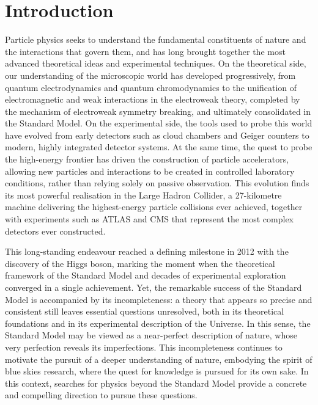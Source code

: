 ﻿%

\chapter{Introduction}






Particle physics seeks to understand the fundamental constituents of nature and the interactions that govern them, and has long brought together the most advanced theoretical ideas and experimental techniques. 
On the theoretical side, our understanding of the microscopic world has developed progressively, 
from quantum electrodynamics and quantum chromodynamics 
to the unification of electromagnetic and weak interactions in the electroweak theory, 
completed by the mechanism of electroweak symmetry breaking, 
and ultimately consolidated in the Standard Model.
On the experimental side, the tools used to probe this world have evolved from early detectors such as cloud chambers and Geiger counters to modern, highly integrated detector systems. 
At the same time, the quest to probe the high-energy frontier has driven the construction of particle accelerators, allowing new particles and interactions to be created in controlled laboratory conditions, rather than relying solely on passive observation.
This evolution finds its most powerful realisation in the Large Hadron Collider, a 27-kilometre machine delivering the highest-energy particle collisions ever achieved, together with experiments such as ATLAS and CMS that represent the most complex detectors ever constructed.

This long-standing endeavour reached a defining milestone in 2012 with the discovery of the Higgs boson, marking the moment when the theoretical framework of the Standard Model and decades of experimental exploration converged in a single achievement.
Yet, the remarkable success of the Standard Model is accompanied by its incompleteness: 
a theory that appears so precise and consistent still leaves essential questions unresolved, 
both in its theoretical foundations and in its experimental description of the Universe. 
In this sense, the Standard Model may be viewed as a near-perfect description of nature, 
whose very perfection reveals its imperfections.
This incompleteness continues to motivate the pursuit of a deeper understanding of nature, embodying the spirit of blue skies research, where the quest for knowledge is pursued for its own sake.
In this context, searches for physics beyond the Standard Model provide a concrete and compelling direction to pursue these questions.

